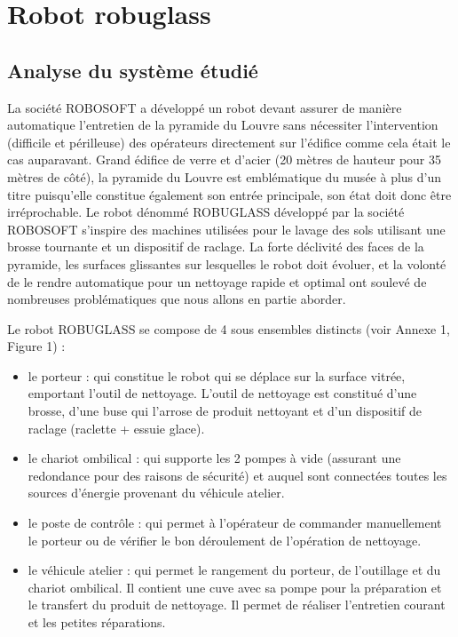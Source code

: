 

\section{Robot robuglass}

\subsection{Analyse du système étudié}

La société ROBOSOFT a développé un robot devant assurer de manière automatique l'entretien de la pyramide du Louvre sans nécessiter l'intervention (difficile et périlleuse) des opérateurs directement sur l'édifice comme cela était le cas auparavant. Grand édifice de verre et d'acier (20 mètres de hauteur pour 35 mètres de côté), la pyramide du Louvre
est emblématique du musée à plus d'un titre puisqu'elle constitue également son entrée principale, son état doit donc être irréprochable. Le robot dénommé ROBUGLASS développé par la société ROBOSOFT s'inspire des machines utilisées pour le lavage des sols utilisant une brosse tournante et un dispositif de raclage. La forte déclivité des faces de la pyramide, les surfaces glissantes sur lesquelles le robot doit évoluer, et la volonté de le rendre automatique pour un
nettoyage rapide et optimal ont soulevé de nombreuses problématiques que nous allons en partie aborder.

Le robot ROBUGLASS se compose de 4 sous ensembles distincts (voir Annexe 1, Figure 1) :
\begin{itemize}
 \item le porteur : qui constitue le robot qui se déplace sur la surface vitrée, emportant l'outil de nettoyage. L'outil de nettoyage est constitué d'une brosse, d'une buse qui l'arrose de produit nettoyant et d'un dispositif de raclage (raclette + essuie glace).
 \item le chariot ombilical : qui supporte les 2 pompes à vide (assurant une redondance pour des raisons de sécurité) et auquel sont connectées toutes les sources d'énergie provenant du véhicule atelier.
 \item le poste de contrôle : qui permet à l'opérateur de commander manuellement le porteur ou de vérifier le bon déroulement de l'opération de nettoyage.
 \item le véhicule atelier : qui permet le rangement du porteur, de l'outillage et du chariot ombilical. Il contient une cuve avec sa pompe pour la préparation et le transfert du produit de nettoyage. Il permet de réaliser l'entretien courant et les petites réparations.
\end{itemize}

